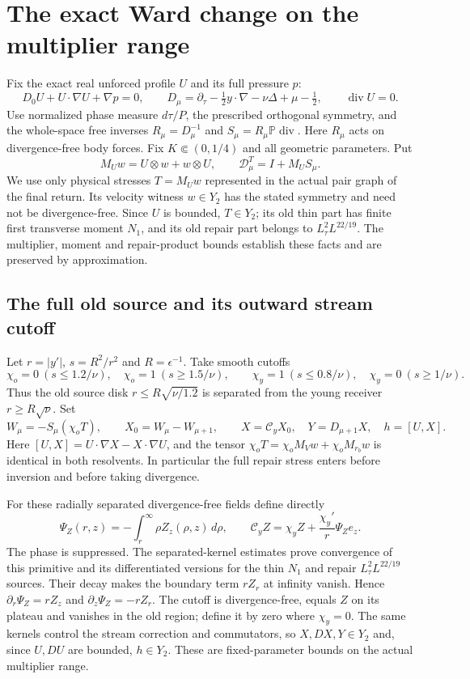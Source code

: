 \section{The exact Ward change on the multiplier range}
\label{sec:short-ward}

Fix the exact real unforced profile $U$ and its full pressure $p$:
\[
 D_0U+U\cdot\nabla U+\nabla p=0,\qquad
 D_\mu=\partial_\tau-\tfrac12y\cdot\nabla-\nu\Delta
                       +\mu-\tfrac12,\qquad \operatorname{div}U=0.
\]
Use normalized phase measure $d\tau/P$, the prescribed orthogonal
symmetry, and the whole-space free inverses
$R_\mu=D_\mu^{-1}$ and $S_\mu=R_\mu\mathbb P\operatorname{div}$.
Here $R_\mu$ acts on divergence-free body forces. Fix
$K\Subset(0,1/4)$ and all geometric parameters. Put
\[
 M_Uw=U\otimes w+w\otimes U,\qquad
 \mathcal D_\mu^T=I+M_US_\mu.
\]
We use only physical stresses $T=M_Uw$ represented in the actual
pair graph of the final return. Its velocity witness $w\in Y_2$
has the stated symmetry and need not be divergence-free. Since $U$ is
bounded, $T\in Y_2$; its old thin part has finite first transverse
moment $N_1$, and its old repair part belongs to
$L^2_\tau L^{22/19}$. The multiplier, moment and repair-product
bounds establish these facts and are preserved by approximation.

\subsection{The full old source and its outward stream cutoff}

Let $r=|y'|$, $s=R^2/r^2$ and $R=\epsilon^{-1}$. Take smooth cutoffs
\[
 \chi_o=0\ (s\le1.2/\nu),\quad \chi_o=1\ (s\ge1.5/\nu),
 \qquad
 \chi_y=1\ (s\le0.8/\nu),\quad \chi_y=0\ (s\ge1/\nu).
\]
Thus the old source disk $r\le R\sqrt{\nu/1.2}$ is separated
from the young receiver $r\ge R\sqrt\nu$. Set
\begin{equation}\label{ward:displacement}
 W_\mu=-S_\mu(\chi_oT),\qquad
 X_0=W_\mu-W_{\mu+1},\qquad
 X=\mathcal C_yX_0,\quad Y=D_{\mu+1}X,\quad h=[U,X].
\end{equation}
Here $[U,X]=U\cdot\nabla X-X\cdot\nabla U$, and the tensor
$\chi_oT=\chi_oM_Vw+\chi_oM_{r_b}w$ is identical in both
resolvents. In particular the full repair stress enters before
inversion and before taking divergence.

For these radially separated divergence-free fields define directly
\[
 \Psi_Z(r,z)=-\int_r^\infty\rho Z_z(\rho,z)\,d\rho,
 \qquad
 \mathcal C_y Z=\chi_yZ+\frac{\chi_y'}r\Psi_Z e_z.
\]
The phase is suppressed. The separated-kernel estimates prove convergence
of this primitive and its differentiated versions for the thin
$N_1$ and repair $L^2_\tau L^{22/19}$ sources. Their decay makes
the boundary term $rZ_r$ at infinity vanish. Hence
$\partial_r\Psi_Z=rZ_z$ and $\partial_z\Psi_Z=-rZ_r$.
The cutoff is divergence-free, equals $Z$ on its plateau and vanishes
in the old region; define it by zero where $\chi_y=0$.
The same kernels control the stream correction and commutators,
so $X,DX,Y\in Y_2$ and, since $U,DU$ are bounded, $h\in Y_2$.
These are fixed-parameter bounds on the actual multiplier range.


